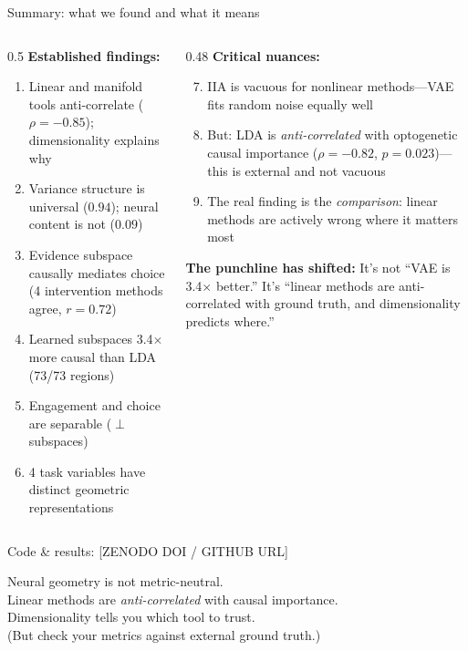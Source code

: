 \documentclass[aspectratio=169,11pt]{beamer}
\begin{document}
\begin{frame}{Summary: what we found and what it means}
\begin{columns}[T]
\begin{column}{0.5\textwidth}
\textbf{Established findings:}
\begin{enumerate}
  \item Linear and manifold tools anti-correlate ($\rho = -0.85$); dimensionality explains why
  \item Variance structure is universal ($0.94$); neural content is not ($0.09$)
  \item Evidence subspace causally mediates choice (4 intervention methods agree, $r = 0.72$)
  \item Learned subspaces 3.4$\times$ more causal than LDA (73/73 regions)
  \item Engagement and choice are separable ($\perp$ subspaces)
  \item 4 task variables have distinct geometric representations
\end{enumerate}
\end{column}
\begin{column}{0.48\textwidth}
\textbf{Critical nuances:}
\begin{enumerate}
  \setcounter{enumi}{6}
  \item \textcolor{fail}{IIA is vacuous for nonlinear methods}---VAE fits random noise equally well
  \item \textcolor{pass}{But:} LDA is \emph{anti-correlated} with optogenetic causal importance ($\rho = -0.82$, $p = 0.023$)---this is external and not vacuous
  \item The real finding is the \emph{comparison}: linear methods are actively wrong where it matters most
\end{enumerate}

\vspace{0.3em}
{\small \textbf{The punchline has shifted:} It's not ``VAE is 3.4$\times$ better.'' It's ``linear methods are anti-correlated with ground truth, and dimensionality predicts where.''}
\end{column}
\end{columns}
\end{frame}

\begin{frame}[standout]
  Code \& results: {\small [ZENODO DOI / GITHUB URL]}

  \vspace{1em}
  Neural geometry is not metric-neutral.\\[0.3em]
  Linear methods are \emph{anti-correlated} with causal importance.\\[0.3em]
  Dimensionality tells you which tool to trust.\\[0.3em]
  {\small (But check your metrics against external ground truth.)}
\end{frame}
\end{document}
